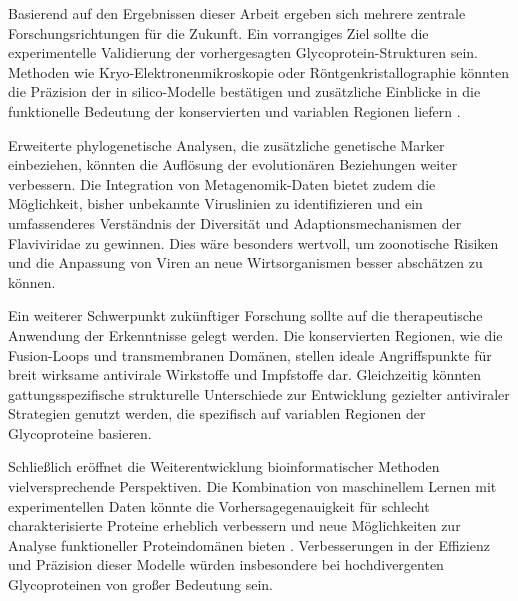 Basierend auf den Ergebnissen dieser Arbeit ergeben sich mehrere zentrale Forschungsrichtungen für die Zukunft. Ein vorrangiges Ziel sollte die experimentelle Validierung der vorhergesagten Glycoprotein-Strukturen sein. Methoden wie Kryo-Elektronenmikroskopie oder Röntgenkristallographie könnten die Präzision der in silico-Modelle bestätigen und zusätzliche Einblicke in die funktionelle Bedeutung der konservierten und variablen Regionen liefern \autocite{Callaway2020}.

Erweiterte phylogenetische Analysen, die zusätzliche genetische Marker einbeziehen, könnten die Auflösung der evolutionären Beziehungen weiter verbessern. Die Integration von Metagenomik-Daten bietet zudem die Möglichkeit, bisher unbekannte Viruslinien zu identifizieren und ein umfassenderes Verständnis der Diversität und Adaptionsmechanismen der Flaviviridae zu gewinnen. Dies wäre besonders wertvoll, um zoonotische Risiken und die Anpassung von Viren an neue Wirtsorganismen besser abschätzen zu können.

Ein weiterer Schwerpunkt zukünftiger Forschung sollte auf die therapeutische Anwendung der Erkenntnisse gelegt werden. Die konservierten Regionen, wie die Fusion-Loops und transmembranen Domänen, stellen ideale Angriffspunkte für breit wirksame antivirale Wirkstoffe und Impfstoffe dar. Gleichzeitig könnten gattungsspezifische strukturelle Unterschiede zur Entwicklung gezielter antiviraler Strategien genutzt werden, die spezifisch auf variablen Regionen der Glycoproteine basieren.

Schließlich eröffnet die Weiterentwicklung bioinformatischer Methoden vielversprechende Perspektiven. Die Kombination von maschinellem Lernen mit experimentellen Daten könnte die Vorhersagegenauigkeit für schlecht charakterisierte Proteine erheblich verbessern und neue Möglichkeiten zur Analyse funktioneller Proteindomänen bieten \autocite{Senior2020}. Verbesserungen in der Effizienz und Präzision dieser Modelle würden insbesondere bei hochdivergenten Glycoproteinen von großer Bedeutung sein.